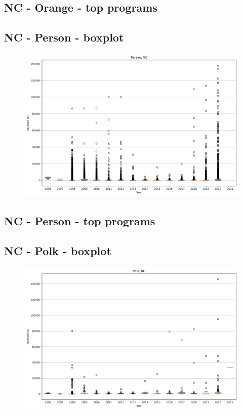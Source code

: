 \subsection*{NC - Orange - top programs}

\newpage
\subsection*{NC - Person - boxplot}
\begin{figure}[h]
\centering
\includegraphics[width=7in]{../output/boxplots/counties/Person-NC_boxplot.png}
\end{figure}


\subsection*{NC - Person - top programs}

\newpage
\subsection*{NC - Polk - boxplot}
\begin{figure}[h]
\centering
\includegraphics[width=7in]{../output/boxplots/counties/Polk-NC_boxplot.png}
\end{figure}


